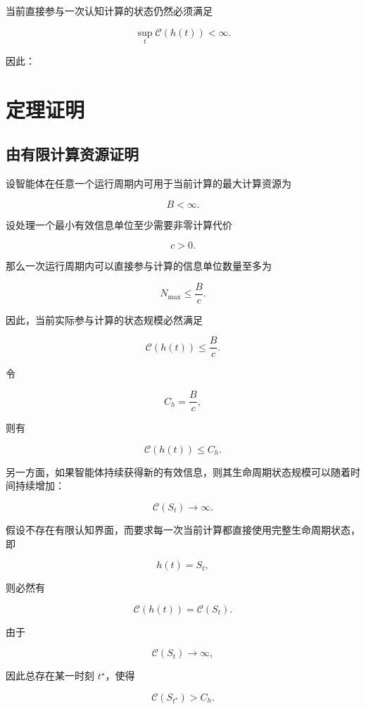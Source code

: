 当前直接参与一次认知计算的状态仍然必须满足

\[
\sup_t
\mathcal{C}(h(t))
<
\infty.
\]

因此：

\begin{statementbox}
\centering
{}
\end{statementbox}


\section{定理证明}

\subsection{由有限计算资源证明}

设智能体在任意一个运行周期内可用于当前计算的最大计算资源为

\[
B<\infty.
\]

设处理一个最小有效信息单位至少需要非零计算代价

\[
c>0.
\]

那么一次运行周期内可以直接参与计算的信息单位数量至多为

\[
N_{\max}
\leq
\frac{B}{c}.
\]

因此，当前实际参与计算的状态规模必然满足

\[
\mathcal{C}(h(t))
\leq
\frac{B}{c}.
\]

令

\[
C_h
=
\frac{B}{c},
\]

则有

\[
\mathcal{C}(h(t))
\leq
C_h.
\]

另一方面，如果智能体持续获得新的有效信息，则其生命周期状态规模可以随着时间持续增加：

\[
\mathcal{C}(S_t)
\rightarrow
\infty.
\]

假设不存在有限认知界面，而要求每一次当前计算都直接使用完整生命周期状态，即

\[
h(t)=S_t,
\]

则必然有

\[
\mathcal{C}(h(t))
=
\mathcal{C}(S_t).
\]

由于

\[
\mathcal{C}(S_t)
\rightarrow
\infty,
\]

因此总存在某一时刻 $t^\star$，使得

\[
\mathcal{C}(S_{t^\star})
>
C_h.
\]

